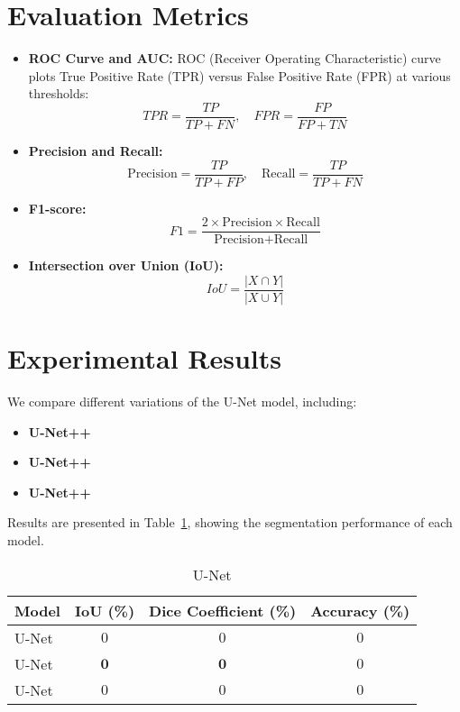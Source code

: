\section{Evaluation Metrics}
\begin{itemize}
    \item \textbf{ROC Curve and AUC:} ROC (Receiver Operating Characteristic) curve plots True Positive Rate (TPR) versus False Positive Rate (FPR) at various thresholds:
    \begin{equation}
        TPR = \frac{TP}{TP + FN}, \quad FPR = \frac{FP}{FP + TN}
    \end{equation}

    \item \textbf{Precision and Recall:}
    \begin{equation}
        \text{Precision} = \frac{TP}{TP + FP}, \quad \text{Recall} = \frac{TP}{TP + FN}
    \end{equation}

    \item \textbf{F1-score:}
    \begin{equation}
        F1 = \frac{2 \times \text{Precision} \times \text{Recall}}{\text{Precision} + \text{Recall}}
    \end{equation}

    \item \textbf{Intersection over Union (IoU):}
    \begin{equation}
        IoU = \frac{|X \cap Y|}{|X \cup Y|}
    \end{equation}


\end{itemize}

\section{Experimental Results}
We compare different variations of the U-Net model, including:
\begin{itemize}
    \item \textbf{U-Net++} 
    \item \textbf{U-Net++} 
    \item \textbf{U-Net++} 
\end{itemize}
Results are presented in Table~\ref{tab::methods_metrics}, showing the segmentation performance of each model.

\begin{table}[!htb]
    \centering
    \caption{U-Net}
    \begin{tabular}{lccc}
    \toprule
    Model & IoU (\%) & Dice Coefficient (\%) & Accuracy (\%) \\
    \midrule
    U-Net & $0$ & $0$ & $0$ \\
    U-Net & $\mathbf{0}$ & $\mathbf{0}$ & $0$ \\
    U-Net & $0$ & $0$ & $0$ \\
    \bottomrule
    \end{tabular}
    \label{tab::methods_metrics}
\end{table}


